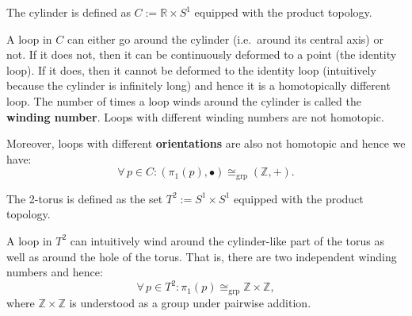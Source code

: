 \documentclass[root.tex]{subfiles}
\begin{document}
\begin{myex}
The cylinder is defined as $C:=\mathbb{R}\times S^1$ equipped with the product topology.

\begin{center}
\end{center}

A loop in $C$ can either go around the cylinder (i.e.\ around its central axis) or not. If it does not, then it can be continuously deformed to a point (the identity loop). If it does, then it cannot be deformed to the identity loop (intuitively because the cylinder is infinitely long) and hence it is a homotopically different loop. The number of times a loop winds around the cylinder is called the \textbf{winding number}. Loops with different winding numbers are not homotopic.

Moreover, loops with different \textbf{orientations} are also not homotopic and hence we have:
$$
\forall \, p \in C : (\pi_1(p),\bullet) \cong_\mathrm{grp}(\mathbb{Z},+).
$$
\end{myex}

\begin{myex}
The 2-torus is defined as the set $T^2:=S^1\times S^1$ equipped with the product topology.
\begin{center}
\end{center}
A loop in $T^2$ can intuitively wind around the cylinder-like part of the torus as well as around the hole of the torus. That is, there are two independent winding numbers and hence:
$$
\forall \, p \in T^2 : \pi_1(p) \cong_\mathrm{grp}\mathbb{Z}\times \mathbb{Z},
$$
where $\mathbb{Z}\times \mathbb{Z}$ is understood as a group under pairwise addition.
\end{myex}
\end{document}
